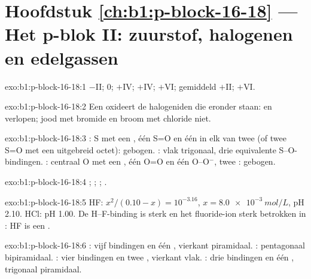 \section*{Hoofdstuk \ref{ch:b1:p-block-16-18} --- Het p-blok II: zuurstof, halogenen en edelgassen}

\begin{solution}{exo:b1:p-block-16-18:1}
 $-$II;  0;  $+$IV;  $+$IV; 
$+$VI;  gemiddeld $+$II;  $+$VI.
\end{solution}

\begin{solution}{exo:b1:p-block-16-18:2}
Een  oxideert de halogeniden die eronder staan:
 en  verlopen;
jood met bromide en broom met chloride niet.
\end{solution}

\begin{solution}{exo:b1:p-block-16-18:3}
: S met een , één S=O en één  in elk van twee
 (of twee S=O met een uitgebreid octet): gebogen.
: vlak trigonaal, drie equivalente S--O-bindingen. :
centraal O met een , één O=O en één O--O$^-$, twee
: gebogen.
\end{solution}

\begin{solution}{exo:b1:p-block-16-18:4}
; ;
; .
\end{solution}

\begin{solution}{exo:b1:p-block-16-18:5}
HF: $x^2/(0.10 - x) = 10^{-3.16}$, $x = \qty{8.0e-3}{mol/L}$, pH 2.10. HCl:
pH 1.00. De H--F-binding is sterk en het fluoride-ion sterk betrokken in
: HF is een .
\end{solution}

\begin{solution}{exo:b1:p-block-16-18:6}
: vijf bindingen en één , vierkant piramidaal.
: pentagonaal bipiramidaal. : vier bindingen en twee
, vierkant vlak. : drie bindingen en één ,
trigonaal piramidaal.
\end{solution}

